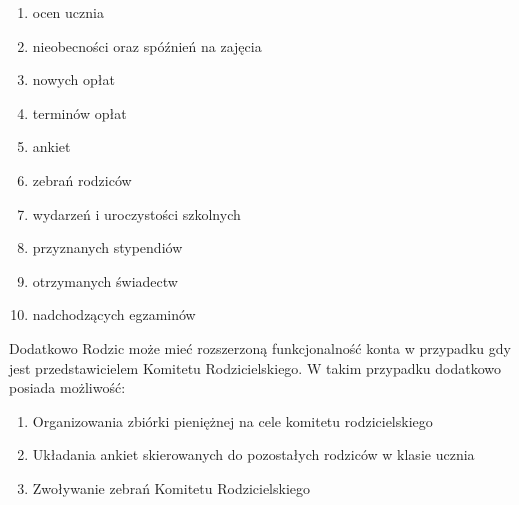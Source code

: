 \documentclass{article}
\begin{document}
\begin{enumerate}
	\begin{enumerate}
		\item ocen ucznia
		\item nieobecności oraz spóźnień na zajęcia
		\item nowych opłat
		\item terminów opłat 
		\item ankiet
		\item zebrań rodziców
		\item wydarzeń i uroczystości szkolnych
		\item przyznanych stypendiów
		\item otrzymanych świadectw
		\item nadchodzących egzaminów
	\end{enumerate}	
\end{enumerate}

Dodatkowo Rodzic może mieć rozszerzoną funkcjonalność konta w przypadku gdy jest przedstawicielem Komitetu Rodzicielskiego. W takim przypadku dodatkowo posiada możliwość:
\begin{enumerate}
	\item Organizowania zbiórki pieniężnej na cele komitetu rodzicielskiego
	\item Układania ankiet skierowanych do pozostałych rodziców w klasie ucznia
	\item Zwoływanie zebrań Komitetu Rodzicielskiego
\end{enumerate}
\end{document}
